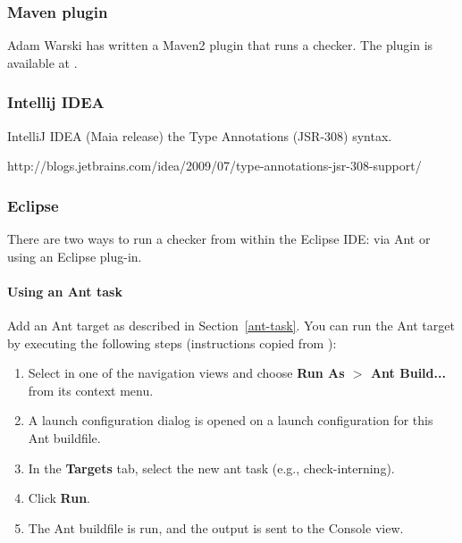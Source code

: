 \subsubsection{Maven plugin\label{maven-task}}

Adam Warski has written a Maven2 plugin that runs a checker.
The plugin is available at 
.


\subsubsection{Intellij IDEA\label{intellij}}

IntelliJ IDEA (Maia release)
the Type Annotations (JSR-308) syntax.

http://blogs.jetbrains.com/idea/2009/07/type-annotations-jsr-308-support/

\subsubsection{Eclipse\label{eclipse}}

There are two ways to run a checker from within the Eclipse IDE:  via Ant
or using an Eclipse plug-in.


\paragraph{Using an Ant task}

Add an Ant target as described in Section~\ref{ant-task}.  You can
run the Ant target by executing the following steps
(instructions copied from
):

\begin{enumerate}

\item
  Select  in one of the navigation views and choose
  {\bf Run As $>$ Ant Build...} from its context menu.

\item
  A launch configuration dialog is opened on a launch configuration
  for this Ant buildfile.

\item
  In the {\bf Targets} tab, select the new ant task (e.g., check-interning).

\item
  Click {\bf Run}.

\item
  The Ant buildfile is run, and the output is sent to the Console view.

\end{enumerate}

